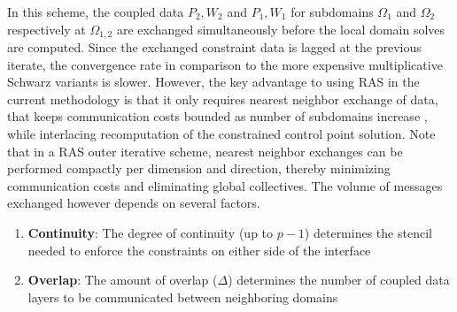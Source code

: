 \documentclass[conference]{IEEEtran}
\newcommand{\eqt}[1]{Equation~(\ref{#1})}
\begin{document}
In this scheme, the coupled data $P_2, W_2$ and $P_1, W_1$ for subdomains $\Omega_1$ and $\Omega_2$ respectively at $\Omega_{1,2}$ are exchanged simultaneously before the local domain solves are computed. Since the exchanged constraint data is lagged at the previous iterate, the convergence rate in comparison to the more expensive multiplicative Schwarz variants \cite{smith-ddm} is slower. However, the key advantage to using RAS in the current methodology is that it only requires nearest neighbor exchange of data, that keeps communication costs bounded as number of subdomains increase \cite{orasm-as-ms-2007, gander-rasm}, while interlacing recomputation of the constrained control point solution. Note that in a RAS outer iterative scheme, nearest neighbor exchanges can be performed compactly per dimension and direction, thereby minimizing communication costs and eliminating global collectives.
%
%
The volume of messages exchanged however depends on several factors.

\begin{enumerate}
	\item \textbf{Continuity}: The degree of continuity (up to $p-1$) determines the stencil needed to enforce the constraints on either side of the interface 
	\item \textbf{Overlap}: The amount of overlap ($\Delta$) determines the number of coupled data layers to be communicated between neighboring domains
\end{enumerate}
\end{document}

